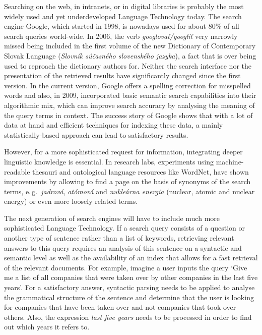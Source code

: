 \begin{multicols}{2}
Searching on the web, in intranets, or in digital libraries is probably the most widely used and yet underdeveloped Language Technology today. The search engine Google, which started in 1998, is nowadays used for about 80\% of all search queries world-wide. In 2006, the verb \emph{googlovať/googliť} very narrowly missed being included in the first volume of the new Dictionary of Contemporary Slovak Language (\emph{Slovník súčasného slovenského jazyka}), a fact that is over being used to reproach the dictionary authors for. Neither the search interface nor the presentation of the retrieved results have significantly changed since the first version. In the current version, Google offers a spelling correction for misspelled words and also, in 2009, incorporated basic semantic search capabilities into their algorithmic mix\cite{pc1}, which can improve search accuracy by analysing the meaning of the query terms in context. The success story of Google shows that with a lot of data at hand and efficient techniques for indexing these data, a mainly statistically-based approach can lead to satisfactory results. 

However, for a more sophisticated request for information, integrating deeper linguistic knowledge is essential. In research labs, experiments using machine-readable thesauri and ontological language resources like WordNet, have shown improvements by allowing to find a page on the basis of synonyms of the search terms, e.\,g.~\emph{jadrová}, \emph{atómová} and \emph{nukleárna energia} (nuclear, atomic and nuclear energy) or even more loosely related terms. 


The next generation of search engines will have to include much more sophisticated Language Technology. If a search query consists of a question or another type of sentence rather than a list of keywords, retrieving relevant answers to this query requires an analysis of this sentence on a syntactic and semantic level as well as the availability of an index that allows for a fast retrieval of the relevant documents. For example, imagine a user inputs the query ‘Give me a list of all companies that were taken over by other companies in the last five years’. For a satisfactory answer, syntactic parsing needs to be applied to analyse the grammatical structure of the sentence and determine that the user is looking for companies that have been taken over and not companies that took over others. Also, the expression \emph{last five years} needs to be processed in order to find out which years it refers to. 


\end{multicols}
